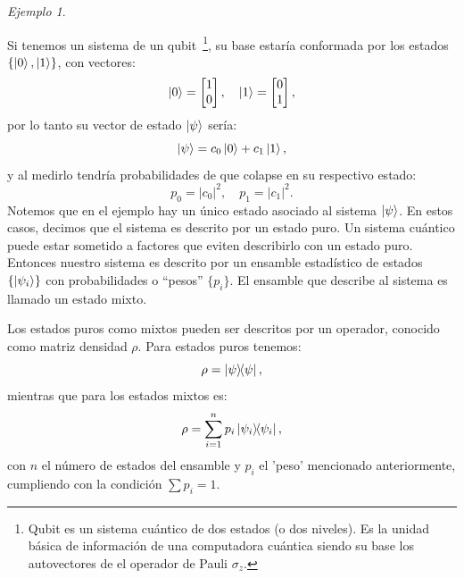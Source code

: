\documentclass[letterpaper,12pt]{thesisECFM}
\theoremstyle{plain}
\theoremstyle{definition}
\theoremstyle{definition}
\theoremstyle{remark}
\newcommand{\1}{\mathbb{1}}
\newtheorem{ex}{Ejemplo}[section]
\begin{document}
\begin{ex} \label{ex: dens1}\end{ex} Si tenemos un sistema de un
qubit~\footnote{Qubit es un sistema cuántico de dos estados (o dos niveles). Es
la
unidad básica de información de una computadora cuántica siendo su base los
autovectores de el operador de Pauli 
$\sigma_z$.}, su base estaría conformada
por los estados $\{{\ket{0},\ket{1}}\}$, con vectores:
\begin{equation}
\ket{0} = \begin{bmatrix} 
    1 \\
    0 \\
    \end{bmatrix}, \quad \ket{1}=\begin{bmatrix} 
    0 \\
    1 \\
    \end{bmatrix},     
\end{equation} 
    por lo tanto su vector de estado $\ket{\psi}$ sería:
    \begin{equation}
      \ket{\psi} = c_0 \ket{0} + c_1 \ket{1},   
    \end{equation}
    y al medirlo tendría probabilidades de que colapse en su respectivo estado:
    \begin{equation}
     p_0=|c_0|^2, \quad p_1=|c_1|^2.
    \end{equation}
Notemos que en el ejemplo hay un único estado asociado al sistema $\ket{\psi}$.
En estos casos, decimos que el sistema es descrito por un estado puro.
Un sistema cuántico puede estar sometido a factores que eviten describirlo con
un estado puro.  Entonces nuestro sistema es descrito por un ensamble
estadístico de estados $\{\ket{\psi_i} \}$  con probabilidades o ``pesos''
$\{p_i\}$. El ensamble que describe al sistema  es llamado un estado mixto.

Los estados puros como mixtos pueden ser descritos por un operador,
conocido como matriz densidad $\rho$. Para estados puros tenemos:
    \begin{equation}
        \label{ec:dens_puros}
        \rho = \ketbra{\psi},
    \end{equation}
mientras que para los estados mixtos es:
\begin{equation}
\label{dens_mixtos}
    \rho = \sum_{i=1}^{n} p_i \ketbra{\psi_i},
\end{equation}
con $n$ el número de estados del ensamble y $p_i$ el 'peso' mencionado
anteriormente, cumpliendo con la condición $\sum p_i =1$.
\end{document}
